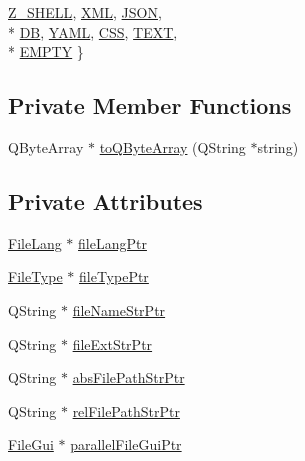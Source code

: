 \begin{DoxyCompactItemize}
\hyperlink{class_ride_file_af8610cfd653a22e79b91ed2f675fc9d5aa4d4ff7351dcf891d4c13cb98d908aae}{Z\-\_\-\-S\-H\-E\-L\-L}, 
\hyperlink{class_ride_file_af8610cfd653a22e79b91ed2f675fc9d5aa2482380d651d5b97bdb0a008dc92878}{X\-M\-L}, 
\hyperlink{class_ride_file_af8610cfd653a22e79b91ed2f675fc9d5a7e0e248617ffbd222b170ab567daf0f1}{J\-S\-O\-N}, 
\\*
\hyperlink{class_ride_file_af8610cfd653a22e79b91ed2f675fc9d5a13b514d2636a4422aae49554c67b4bff}{D\-B}, 
\hyperlink{class_ride_file_af8610cfd653a22e79b91ed2f675fc9d5a9c1ec7e2486224af3cec29825d5bd7b6}{Y\-A\-M\-L}, 
\hyperlink{class_ride_file_af8610cfd653a22e79b91ed2f675fc9d5adf808e16062136eac11f5b06561e1c12}{C\-S\-S}, 
\hyperlink{class_ride_file_af8610cfd653a22e79b91ed2f675fc9d5a177ee42e718379672875012a5e372a70}{T\-E\-X\-T}, 
\\*
\hyperlink{class_ride_file_af8610cfd653a22e79b91ed2f675fc9d5ad5d2521446a12c2487e2e6c76655cf74}{E\-M\-P\-T\-Y}
 \}
\end{DoxyCompactItemize}
\subsection*{Private Member Functions}
\begin{DoxyCompactItemize}
\item 
Q\-Byte\-Array $\ast$ \hyperlink{class_ride_file_a3c2c5e96628e3689c041e7a9e28970c2}{to\-Q\-Byte\-Array} (Q\-String $\ast$string)
\end{DoxyCompactItemize}
\subsection*{Private Attributes}
\begin{DoxyCompactItemize}
\item 
\hyperlink{class_ride_file_af2f1eb81fe20b91d4d3b8d96e457380a}{File\-Lang} $\ast$ \hyperlink{class_ride_file_acbfd3155fd50ad8fa0711ae3e452f372}{file\-Lang\-Ptr}
\item 
\hyperlink{class_ride_file_af8610cfd653a22e79b91ed2f675fc9d5}{File\-Type} $\ast$ \hyperlink{class_ride_file_acdbc170d7f02d66dffb8b715609735c2}{file\-Type\-Ptr}
\item 
Q\-String $\ast$ \hyperlink{class_ride_file_a6eeba18da5e7d5e7b3afde7c65bd1f7a}{file\-Name\-Str\-Ptr}
\item 
Q\-String $\ast$ \hyperlink{class_ride_file_a29d334700d1480159fc69b59f7dc02a8}{file\-Ext\-Str\-Ptr}
\item 
Q\-String $\ast$ \hyperlink{class_ride_file_a48f3da6d11df5097b65290213c050a28}{abs\-File\-Path\-Str\-Ptr}
\item 
Q\-String $\ast$ \hyperlink{class_ride_file_a47152ef70bd5486c4cbaa5c12e5346d4}{rel\-File\-Path\-Str\-Ptr}
\item 
\hyperlink{class_file_gui}{File\-Gui} $\ast$ \hyperlink{class_ride_file_ab2a6a17fda833b6e592968cde2aa18dc}{parallel\-File\-Gui\-Ptr}
\end{DoxyCompactItemize}


